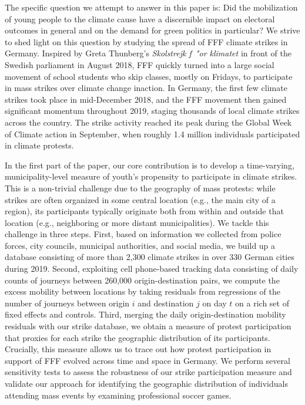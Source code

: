The specific question we attempt to answer in this paper is: Did the mobilization of young people to the climate cause have a discernible impact on electoral outcomes in general and on the demand for green politics in particular? We strive to shed light on this question by studying the spread of FFF climate strikes in Germany. Inspired by Greta Thunberg's \emph{Skolstrejk f\ "{o}r klimatet} in front of the Swedish parliament in August 2018, FFF quickly turned into a large social movement of school students who skip classes, mostly on Fridays, to participate in mass strikes over climate change inaction. In Germany, the first few climate strikes took place in mid-December 2018, and the FFF movement then gained significant momentum throughout 2019, staging thousands of local climate strikes across the country. The strike activity reached its peak during the Global Week of Climate action in September, when roughly 1.4 million individuals participated in climate protests.

In the first part of the paper, our core contribution is to develop a time-varying, municipality-level measure of youth's propensity to participate in climate strikes. This is a non-trivial challenge due to the geography of mass protests: while strikes are often organized in some central location (e.g., the main city of a region), its participants typically originate both from within and outside that location (e.g., neighboring or more distant municipalities). We tackle this challenge in three steps. First, based on information we collected from police forces, city councils, municipal authorities, and social media, we build up a database consisting of more than 2,300 climate strikes in over 330 German cities during 2019. Second, exploiting cell phone-based tracking data consisting of daily counts of journeys between 260,000 origin-destination pairs, we compute the excess mobility between locations by taking residuals from regressions of the number of journeys between origin $i$ and destination $j$ on day $t$ on a rich set of fixed effects and controls. Third, merging the daily origin-destination mobility residuals with our strike database, we obtain a measure of protest participation that proxies for each strike the geographic distribution of its participants. Crucially, this measure allows us to trace out how protest participation in support of FFF evolved across time and space in Germany. We perform several sensitivity tests to assess the robustness of our strike participation measure and validate our approach for identifying the geographic distribution of individuals attending mass events by examining professional soccer games.

